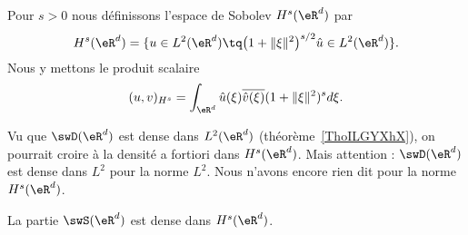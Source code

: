 \begin{definition}     \label{DEFooWEAQooAIWBwx}
	Pour \( s>0\) nous définissons l'espace de Sobolev \( H^s(\eR^d)\) par
	\begin{equation}
		H^s(\eR^d)=\{ u\in L^2(\eR^d)\tq  \big( 1+\| \xi \|^2 \big)^{s/2}\hat u\in L^2(\eR^d)  \}.
	\end{equation}
	Nous y mettons le produit scalaire
	\begin{equation}
		(u,v)_{H^s}=\int_{\eR^d}\hat u(\xi)\overline{ \hat v(\xi) }(1+\| \xi \|^2)^sd\xi.
	\end{equation}
\end{definition}

\begin{normaltext}
	Vu que \( \swD(\eR^d)\) est dense dans \( L^2(\eR^d)\) (théorème~\ref{ThoILGYXhX}), on pourrait croire à la densité a fortiori dans \( H^s(\eR^d)\). Mais attention : \( \swD(\eR^d)\) est dense dans \( L^2\) pour la norme \( L^2\). Nous n'avons encore rien dit pour la norme \( H^s(\eR^d)\).
\end{normaltext}

\begin{proposition}      \label{PROPooMKAFooKDNTbO}
	La partie \( \swS(\eR^d)\) est dense dans \( H^s(\eR^d)\).
\end{proposition}

